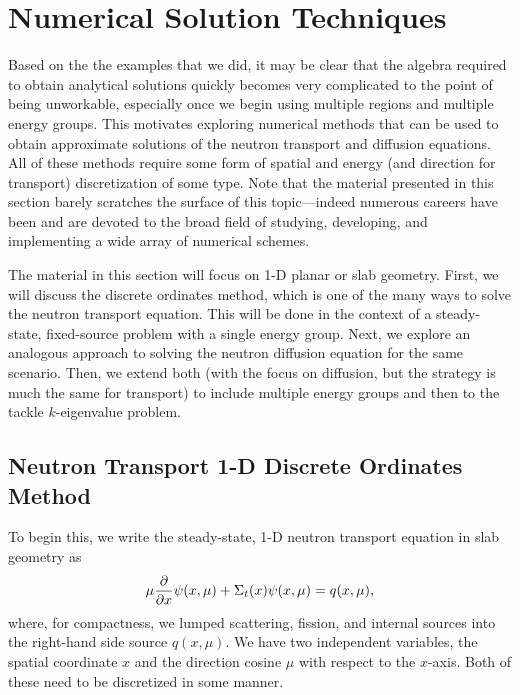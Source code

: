 \section{Numerical Solution Techniques}

Based on the the examples that we did, it may be clear that the algebra required to obtain analytical solutions quickly becomes very complicated to the point of being unworkable, especially once we begin using multiple regions and multiple energy groups. This motivates exploring numerical methods that can be used to obtain approximate solutions of the neutron transport and diffusion equations. All of these methods require some form of spatial and energy (and direction for transport) discretization of some type. Note that the material presented in this section barely scratches the surface of this topic---indeed numerous careers have been and are devoted to the broad field of studying, developing, and implementing a wide array of numerical schemes.

The material in this section will focus on 1-D planar or slab geometry. First, we will discuss the discrete ordinates method, which is one of the many ways to solve the neutron transport equation. This will be done in the context of a steady-state, fixed-source problem with a single energy group. Next, we explore an analogous approach to solving the neutron diffusion equation for the same scenario. Then, we extend both (with the focus on diffusion, but the strategy is much the same for transport) to include multiple energy groups and then to the tackle $k$-eigenvalue problem.

\subsection{Neutron Transport 1-D Discrete Ordinates Method}

To begin this, we write the steady-state, 1-D neutron transport equation in slab geometry as
\begin{align}
  \mu \frac{ \partial {} }{ \partial {x} } \psi(x,\mu) + \Sigma_t(x) \psi(x,\mu) = q(x,\mu) ,
\end{align}
where, for compactness, we lumped scattering, fission, and internal sources into the right-hand side source $q(x,\mu)$. We have two independent variables, the spatial coordinate $x$ and the direction cosine $\mu$ with respect to the $x$-axis. Both of these need to be discretized in some manner.


